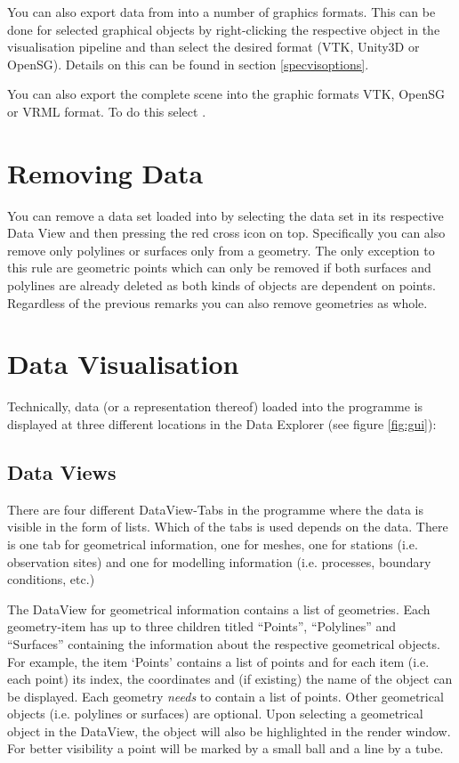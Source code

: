 \bigskip

You can also export data from \ogs into a number of graphics formats. This can be done for selected graphical objects by right-clicking the respective object in the visualisation pipeline and than select the desired format (VTK, Unity3D or OpenSG). Details on this can be found in section \ref{specvisoptions}.

You can also export the complete scene into the graphic formats VTK, OpenSG or VRML format. To do this select .

\section{Removing Data}

You can remove a data set loaded into \ogs by selecting the data set in its respective Data View and then pressing the red cross icon on top. Specifically you can also remove only polylines or surfaces only from a geometry. The only exception to this rule are geometric points which can only be removed if both surfaces and polylines are already deleted as both kinds of objects are dependent on points. Regardless of the previous remarks you can also remove geometries as whole.

\section{Data Visualisation}
\label{datavisualisation}

Technically, data (or a representation thereof) loaded into the programme is displayed at three different locations in the Data Explorer (see figure \ref{fig:gui}):

\subsection{Data Views}

There are four different DataView-Tabs in the programme where the data is visible in the form of lists. Which of the tabs is used depends on the data. There is one tab for geometrical information, one for meshes, one for stations (i.e. observation sites) and one for modelling information (i.e. processes, boundary conditions, etc.)

The DataView for geometrical information contains a list of geometries. Each geometry-item has up to three children titled ``Points'', ``Polylines'' and ``Surfaces'' containing the information about the respective geometrical objects. For example, the item `Points' contains a list of points and for each item (i.e. each point) its index, the coordinates and (if existing) the name of the object can be displayed. Each geometry \emph{needs} to contain a list of points. Other geometrical objects (i.e. polylines or surfaces) are optional. Upon selecting a geometrical object in the DataView, the object will also be highlighted in the render window. For better visibility a point will be marked by a small ball and a line by a tube.

